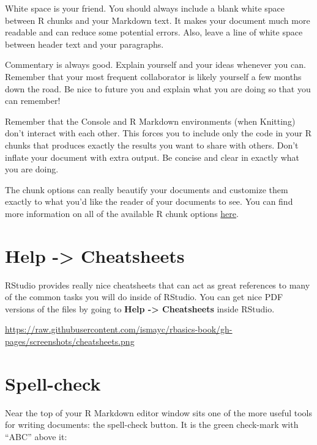 \documentclass[]{tufte-book}
\begin{document}
White space is your friend. You should always include a blank white space between R chunks and your Markdown text. It makes your document much more readable and can reduce some potential errors. Also, leave a line of white space between header text and your paragraphs.

Commentary is always good. Explain yourself and your ideas whenever you can. Remember that your most frequent collaborator is likely yourself a few months down the road. Be nice to future you and explain what you are doing so that you can remember!

Remember that the Console and R Markdown environments (when Knitting) don't interact with each other. This forces you to include only the code in your R chunks that produces exactly the results you want to share with others. Don't inflate your document with extra output. Be concise and clear in exactly what you are doing.

The chunk options can really beautify your documents and customize them exactly to what you'd like the reader of your documents to see. You can find more information on all of the available R chunk options \href{http://yihui.name/knitr/options/}{here}.

\hypertarget{help---cheatsheets}{%
\section{Help -\textgreater{} Cheatsheets}\label{help---cheatsheets}}

RStudio provides really nice cheatsheets that can act as great references to many of the common tasks you will do inside of RStudio. You can get nice PDF versions of the files by going to \textbf{Help -\textgreater{} Cheatsheets} inside RStudio.

\vspace{0.1in}\begin{center}\footnotesize{\url{https://raw.githubusercontent.com/ismayc/rbasics-book/gh-pages/screenshots/cheatsheets.png}}\end{center}\vspace{0.1in}

\hypertarget{spell-check}{%
\section{Spell-check}\label{spell-check}}

Near the top of your R Markdown editor window sits one of the more useful tools for writing documents: the spell-check button. It is the green check-mark with ``ABC'' above it:
\end{document}
